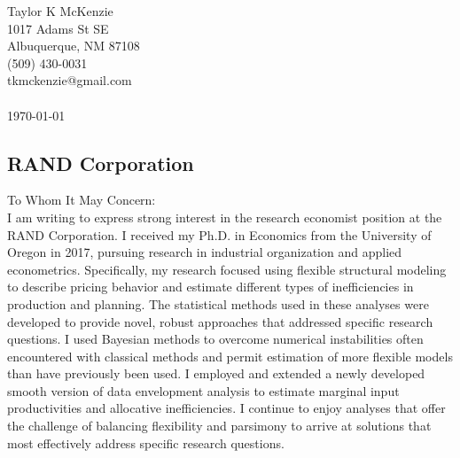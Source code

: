 \documentclass[]{article}
\begin{document}
\thispagestyle{empty}

\noindent Taylor K McKenzie\\1017 Adams St SE\\ Albuquerque, NM 87108\\ (509) 430-0031\\ tkmckenzie@gmail.com\\ \\
\today

\subsection*{RAND Corporation}

To Whom It May Concern: \\

I am writing to express strong interest in the research economist position at the RAND Corporation. I received my Ph.D. in Economics from the University of Oregon in 2017, pursuing research in industrial organization and applied econometrics. Specifically, my research focused using flexible structural modeling to describe pricing behavior and estimate different types of inefficiencies in production and planning. The statistical methods used in these analyses were developed to provide novel, robust approaches that addressed specific research questions. I used Bayesian methods to overcome numerical instabilities often encountered with classical methods and permit estimation of more flexible models than have previously been used. I employed and extended a newly developed smooth version of data envelopment analysis to estimate marginal input productivities and allocative inefficiencies. I continue to enjoy analyses that offer the challenge of balancing flexibility and parsimony to arrive at solutions that most effectively address specific research questions.\\
\end{document}
